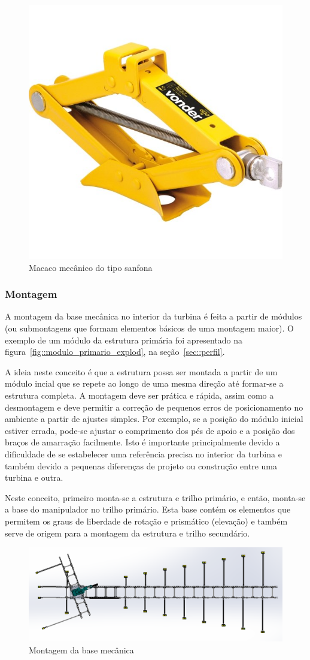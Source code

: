 \begin{figure}[h!]
	\centering
	\includegraphics[width=0.4\columnwidth]{method/figs/construcao/macaco_sanfona}
	\caption{Macaco mecânico do tipo sanfona}
    \label{fig::macaco_sanfona}
\end{figure}

\subsubsection{Montagem}

A montagem da base mecânica no interior da turbina é feita a partir de módulos
(ou submontagens que formam elementos básicos de uma montagem maior). O exemplo
de um módulo da estrutura primária foi apresentado na
figura~\ref{fig::modulo_primario_explod}, na seção~\ref{sec::perfil}. 

A ideia neste conceito é que a estrutura possa ser montada a partir de um módulo
incial que se repete ao longo de uma mesma direção até formar-se a estrutura
completa. A montagem deve ser prática e rápida, assim como a desmontagem e
deve permitir a correção de pequenos erros de posicionamento no
ambiente a partir de ajustes simples. Por exemplo, se a posição do módulo
inicial estiver errada, pode-se ajustar o comprimento dos pés de apoio e a
posição dos braços de amarração facilmente. Isto é importante principalmente
devido a dificuldade de se estabelecer uma referência precisa no interior da
turbina e também devido a pequenas diferenças de projeto ou construção entre uma
turbina e outra.



Neste conceito, primeiro monta-se a estrutura e trilho
primário, e então, monta-se a base do manipulador no trilho primário. Esta base
contém os elementos que permitem os graus de liberdade de rotação e prismático
(elevação) e também serve de origem para a montagem da estrutura e trilho
secundário. 

\begin{figure}[h!]
	\centering
	\includegraphics[width=0.9\columnwidth]{method/figs/construcao/EMMA_Base_Secundaria_04}
	\caption{Montagem da base mecânica}
    \label{fig::EMMA_Base_Secundaria_04}
\end{figure}

